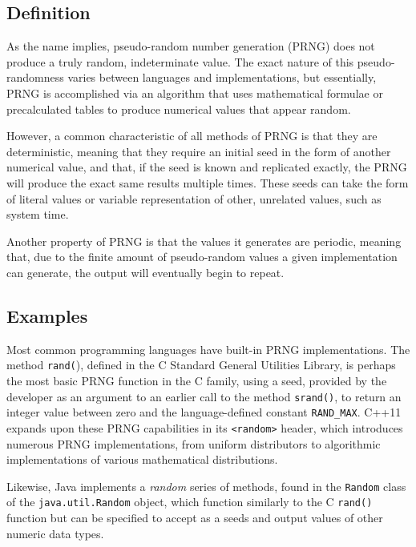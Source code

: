\subsection{Definition}
As the name implies, pseudo-random number generation (PRNG) does not produce a truly random, indeterminate value. The exact nature of this pseudo-randomness varies between languages and implementations, but essentially, PRNG is accomplished via an algorithm that uses mathematical formulae or precalculated tables to produce numerical values that appear random.\autocite{20210517:haahr}

However, a common characteristic of all methods of PRNG is that they are deterministic, meaning that they require an initial seed in the form of another numerical value, and that, if the seed is known and replicated exactly, the PRNG will produce the exact same results multiple times. These seeds can take the form of literal values or variable representation of other, unrelated values, such as system time.

Another property of PRNG is that the values it generates are periodic, meaning that, due to the finite amount of pseudo-random values a given implementation can generate, the output will eventually begin to repeat.

\subsection{Examples}
Most common programming languages have built-in PRNG implementations. The method \texttt{rand(}), defined in the C Standard General Utilities Library, is perhaps the most basic PRNG function in the C family, using a seed, provided by the developer as an argument to an earlier call to the method \texttt{srand()}, to return an integer value between zero and the language-defined constant \texttt{RAND\_MAX}.\autocite{20210517:cpp-rand} C++11 expands upon these PRNG capabilities in its \texttt{<random>} header, which introduces numerous PRNG implementations, from uniform distributors to algorithmic implementations of various mathematical distributions.\autocite{20210517:cpp-random}

Likewise, Java implements a \textit{random} series of methods, found in the \texttt{Random} class of the \texttt{java\-.\-util\-.\-Random} object, which function similarly to the C \texttt{rand()} function but can be specified to accept as a seeds and output values of other numeric data types.\autocite{20210517:java}

